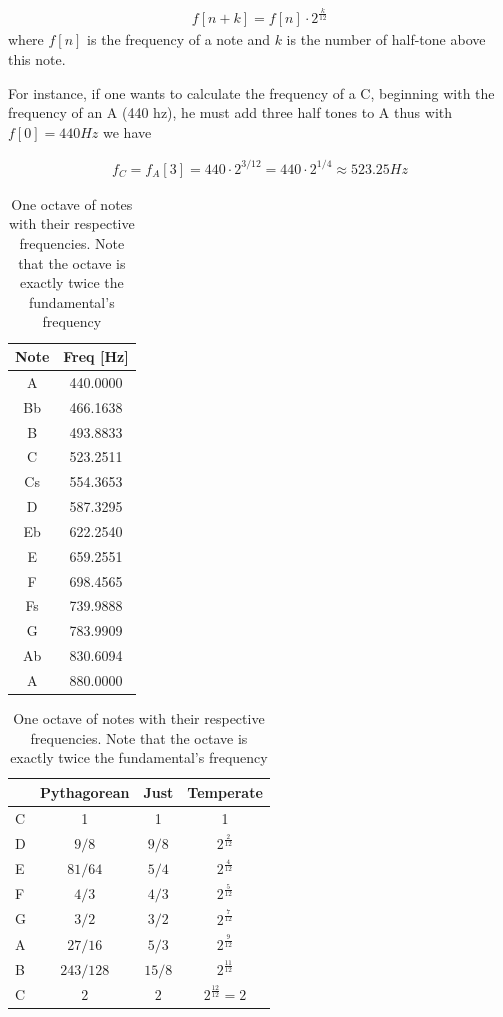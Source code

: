\begin{eqnarray}
	f[n+k]=f[n]\cdot2^{\frac{k}{12}}
\end{eqnarray}
where $f[n]$ is the frequency of a note and $k$ is the number of half-tone above this note.

For instance, if one wants to calculate the frequency of a C, beginning with the frequency of an A (440 hz), he must add three half tones to A thus with $f[0]=440 Hz$ we have

\begin{eqnarray*}
	f_C=f_A[3]=440\cdot2^{3/12}=440\cdot2^{1/4}\approx 523.25 Hz
\end{eqnarray*}

\begin{table}
	\begin{tabular}{c | c}
		Note & Freq [Hz] \\
		\hline
		A & 440.0000 \\		
		Bb &  466.1638\\
		B &  493.8833\\
		C & 523.2511\\
		Cs &  554.3653\\
		D &   587.3295\\
		Eb &  622.2540\\
		E &  659.2551\\
		F &  698.4565\\
		Fs &  739.9888\\
		G &  783.9909\\  
		Ab & 830.6094\\
	  	A & 880.0000 \\
	\end{tabular}
	\caption{One octave of notes with their respective frequencies. Note that the octave is exactly twice the fundamental's frequency}
\end{table}


\begin{table}
	\begin{tabular}{l|c | c | c}
		&Pythagorean  & Just & Temperate \\
		\hline
		C & 1 & 1 & 1 \\		
		D &  $9/8$ & $9/8$ &$2^{\frac{2}{12}}$\\
		E & $81/64$ & $5/4$ & $2^{\frac{4}{12}}$\\
		F & $4/3$ & $4/3$ & $2^{\frac{5}{12}}$\\
		G & $3/2$ &$3/2$ & $2^{\frac{7}{12}}$\\
		A &   $27/16$ &$5/3$ & $2^{\frac{9}{12}}$\\
		B &  $243/128$ & $15/8$ & $2^{\frac{11}{12}}$\\
		C &  $2$ & $2$ & $2^{\frac{12}{12}}=2$\\
	\end{tabular}
	\caption{One octave of notes with their respective frequencies. Note that the octave is exactly twice the fundamental's frequency}
\end{table}

